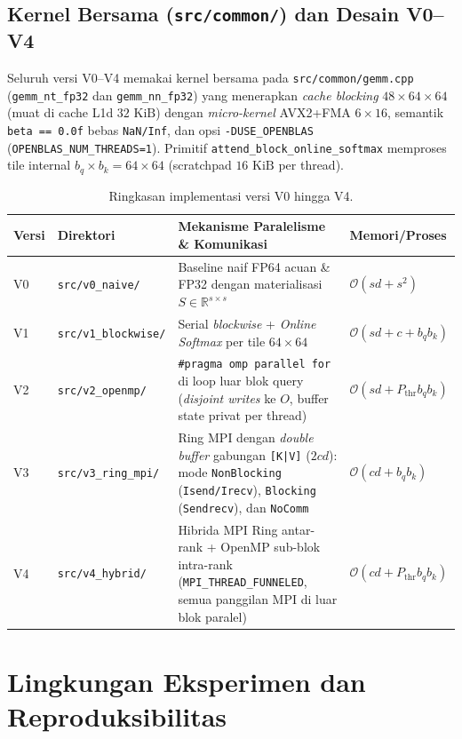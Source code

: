 \documentclass[11pt,a4paper]{article}
\begin{document}
\subsection{Kernel Bersama (\texttt{src/common/}) dan Desain V0--V4}
Seluruh versi V0--V4 memakai kernel bersama pada \texttt{src/common/gemm.cpp} (\texttt{gemm\_nt\_fp32} dan \texttt{gemm\_nn\_fp32}) yang menerapkan \emph{cache blocking} $48 \times 64 \times 64$ (muat di cache L1d $32\text{ KiB}$) dengan \emph{micro-kernel} AVX2+FMA $6 \times 16$, semantik \texttt{beta == 0.0f} bebas \texttt{NaN/Inf}, dan opsi \texttt{-DUSE\_OPENBLAS} (\texttt{OPENBLAS\_NUM\_THREADS=1}). Primitif \texttt{attend\_block\_online\_softmax} memproses tile internal $b_q \times b_k = 64 \times 64$ (scratchpad $16\text{ KiB}$ per thread).

\begin{table}[H]
\centering
\caption{Ringkasan implementasi versi V0 hingga V4.}
\begin{tabular}{llp{8.2cm}l}
\toprule
\textbf{Versi} & \textbf{Direktori} & \textbf{Mekanisme Paralelisme \& Komunikasi} & \textbf{Memori/Proses} \\
\midrule
V0 & \texttt{src/v0\_naive/} & Baseline naif FP64 acuan \& FP32 dengan materialisasi $S \in \mathbb{R}^{s \times s}$ & $\mathcal{O}(sd + s^2)$ \\
V1 & \texttt{src/v1\_blockwise/} & Serial \emph{blockwise} + \emph{Online Softmax} per tile $64\times 64$ & $\mathcal{O}(sd + c + b_q b_k)$ \\
V2 & \texttt{src/v2\_openmp/} & \texttt{\#pragma omp parallel for} di loop luar blok query (\emph{disjoint writes} ke $O$, buffer state privat per thread) & $\mathcal{O}(sd + P_{\mathrm{thr}} b_q b_k)$ \\
V3 & \texttt{src/v3\_ring\_mpi/} & Ring MPI dengan \emph{double buffer} gabungan \texttt{[K|V]} ($2cd$): mode \texttt{NonBlocking} (\texttt{Isend/Irecv}), \texttt{Blocking} (\texttt{Sendrecv}), dan \texttt{NoComm} & $\mathcal{O}(cd + b_q b_k)$ \\
V4 & \texttt{src/v4\_hybrid/} & Hibrida MPI Ring antar-rank + OpenMP sub-blok intra-rank (\texttt{MPI\_THREAD\_FUNNELED}, semua panggilan MPI di luar blok paralel) & $\mathcal{O}(cd + P_{\mathrm{thr}} b_q b_k)$ \\
\bottomrule
\end{tabular}
\end{table}

\section{Lingkungan Eksperimen dan Reproduksibilitas}
\end{document}
